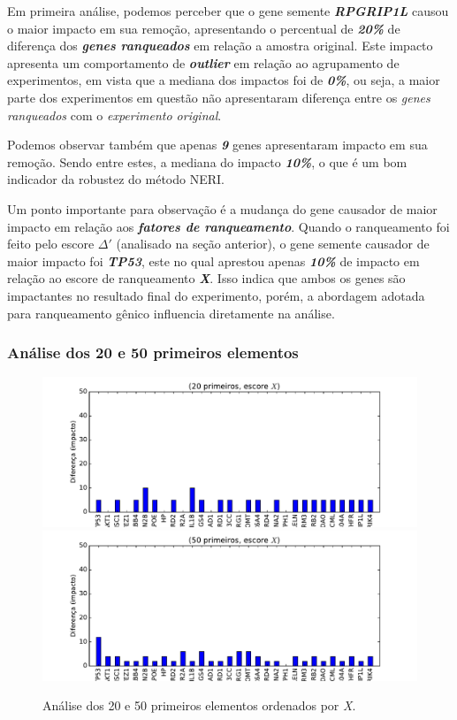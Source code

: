 Em primeira análise, podemos perceber que o gene semente \textbf{\textsl{RPGRIP1L}} causou o maior impacto em sua remoção, apresentando o percentual de \textsl{\textbf{20\%}} de diferença dos \textsl{\textbf{genes ranqueados}} em relação a amostra original. Este impacto apresenta um comportamento de \textsl{\textbf{outlier}} em relação ao agrupamento de experimentos, em vista que a mediana dos impactos foi de \textsl{\textbf{0\%}}, ou seja, a maior parte dos experimentos em questão não apresentaram diferença entre os \textsl{genes ranqueados} com o \textsl{experimento original}.
%

Podemos observar também que apenas \textsl{\textbf{9}} genes apresentaram impacto em sua remoção. Sendo entre estes, a mediana do impacto \textsl{\textbf{10\%}}, o que é um bom indicador da robustez do método NERI.
%

Um ponto importante para observação é a mudança do gene causador de maior impacto em relação aos \textsl{\textbf{fatores de ranqueamento}}. Quando o ranqueamento foi feito pelo escore \textsl{\textbf{$\Delta'$}} (analisado na seção anterior), o gene semente causador de maior impacto foi \textsl{\textbf{TP53}}, este no qual aprestou apenas \textsl{\textbf{10\%}} de impacto em relação ao escore de ranqueamento \textsl{\textbf{X}}. Isso indica que ambos os genes são impactantes no resultado final do experimento, porém, a abordagem adotada para ranqueamento gênico influencia diretamente na análise.
%


\subsubsection{Análise dos 20 e 50 primeiros elementos}
%
\begin{figure}[ht!]
\includegraphics[width=1\textwidth]{Images/analyses/fig_LOO_X_20.pdf}
\includegraphics[width=1\textwidth]{Images/analyses/fig_LOO_X_50.pdf}
\caption {Análise dos 20 e 50 primeiros elementos ordenados por \textit{X}.
\label{fig_LOO_X_20-50}}
\end{figure}
%

